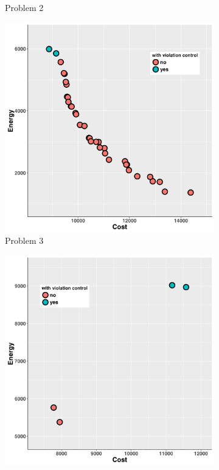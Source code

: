 \begin{figure}
\begin{subfigure}[b]{0.45\textwidth}
   \caption{Problem 2}
   \label{fig:b}
   \end{subfigure}
   \begin{subfigure}[b]{0.45\textwidth}\includegraphics[width=\textwidth]{pics/preliminary/3/evolve.png}
   \caption{Problem 3}
   \label{fig:c}
   \end{subfigure}
   \begin{subfigure}[b]{0.45\textwidth}\includegraphics[width=\textwidth]{pics/preliminary/4/evolve.png}

\end{subfigure}
\end{figure}
